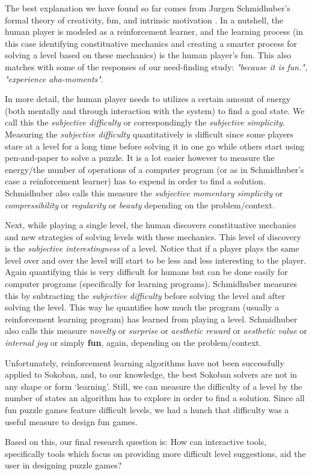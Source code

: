 The best explanation we have found so far comes from Jurgen Schmidhuber's formal theory of creativity, fun, and intrinsic motivation \cite{Schmidhuber}. In a nutshell, the human player is modeled as a reinforcement learner, and the learning process (in this case identifying constituative mechanics and creating a smarter process for solving a level based on these mechanics) is the human player's fun. This also matches with some of the responses of our need-finding study: \textit{"because it is fun.", "experience aha-moments"}.

In more detail, the human player needs to utilizes a certain amount of energy (both mentally and through interaction with the system) to find a goal state. We call this the \textit{subjective difficulty} or correspondingly the \textit{subjective simplicity}. Measuring the \textit{subjective difficulty} quantitatively is difficult since some players stare at a level for a long time before solving it in one go while others start using pen-and-paper to solve a puzzle. It is a lot easier however to measure the energy/the number of operations of a computer program (or as in Schmidhuber's case a reinforcement learner) has to expend in order to find a solution. Schmidhuber also calls this measure the \textit{subjective momentary simplicity} or \textit{compressibility} or \textit{regularity} or \textit{beauty} depending on the problem/context.

Next, while playing a single level, the human discovers constituative mechanics and new strategies of solving levels with these mechanics. This level of discovery is the \textit{subjective interestingness} of a level. Notice that if a player plays the same level over and over the level will start to be less and less interesting to the player. Again quantifying this is very difficult for humans but can be done easily for computer programs (specifically for learning programs). Schmidhuber measures this by subtracting the \textit{subjective difficulty} before solving the level and after solving the level. This way he quantifies how much the program (usually a reinforcement learning program) has learned from playing a level. Schmidhuber also calls this measure \textit{novelty} or \textit{surprise} or \textit{aesthetic reward} or \textit{aesthetic value} or \textit{internal joy} or simply \textbf{fun}, again, depending on the problem/context.

Unfortunately, reinforcement learning algorithms have not been successfully applied to Sokoban, and, to our knowledge, the best Sokoban solvers are not in any shape or form `learning'. Still, we can measure the difficulty of a level by the number of states an algorithm has to explore in order to find a solution.
Since all fun puzzle games feature difficult levels, we had a hunch that difficulty was a useful measure to design fun games. 

Based on this, our final research question is: How can interactive tools, specifically tools which focus on providing more difficult level suggestions, aid the user in designing puzzle games?